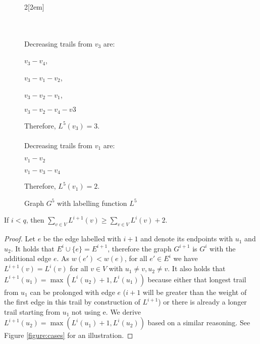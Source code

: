 \begin{isabellebody}
\begin{isamarkuptext}
\begin{figure}
	\begin{multicols}{2}[\columnsep2em] 

	\\
		\columnbreak
		\vspace{7cm}
		\ \\
		Decreasing trails from $v_3$ are: 
		
		$v_3-v_4$,  
		
		$v_3-v_1-v_2$, 
		
		$v_3-v_2-v_1$,
		
		$v_3-v_2-v_4-v3$
		
		Therefore, $L^5(v_3) = 3$.\\ \ \\

		Decreasing trails from $v_1$ are:
		
		$v_1-v_2$
		
		$v_1-v_3-v_4$
		
		Therefore, $L^5(v_1) = 2$.
	\end{multicols}
	
  \caption{Graph $G^5$ with labelling function $L^5$}\label{example:G5}
\end{figure}

\begin{lemma}\label{lemma:sum}
If $i < q$, then $\sum_{v\in V} L^{i+1}(v) \ge \sum_{v\in V} L^{i}(v)+2$.
\end{lemma}
\vspace{-1em}
\begin{proof}
Let $e$ be the edge labelled with $i+1$ and denote its endpoints with $u_1$ and $u_2$. It holds that $E^i \cup \{e\} = E^{i+1}$, 
therefore the graph $G^{i+1}$ is $G^i$ with the additional edge $e$. As $w(e') < w(e) $, for all $e' \in E^i$ we have 
 $L^{i+1}(v) = L^i(v)$ for all $v\in V$ with $u_1\neq v, u_2\neq v$. It also holds that $L^{i+1}(u_1) = \max(L^i(u_2)+1,L^i(u_1))$ 
because either that longest trail from $u_1$ can be prolonged with edge $e$ ($i+1$ will be greater than the weight of the first edge 
in this trail by construction of $L^{i+1}$) or there is already a longer trail starting from $u_1$ not using e. 
We derive $L^{i+1}(u_2) = \max(L^i(u_1)+1,L^i(u_2))$ based on a similar reasoning. See Figure \ref{figure:cases} for an illustration. 


\end{proof}
\end{isamarkuptext}
\end{isabellebody}
